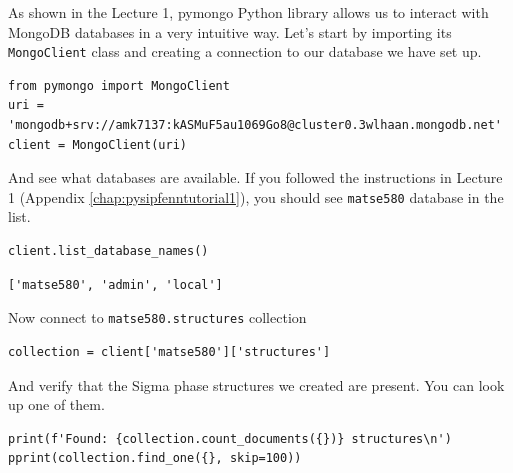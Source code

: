 \label{pysipfenntutorial2:verify-the-connection-to-the-database}

As shown in the Lecture 1, pymongo Python library allows us to interact
with MongoDB databases in a very intuitive way. Let's start by importing
its \texttt{MongoClient} class and creating a
connection to our database we have set up.

\begin{verbatim}
from pymongo import MongoClient
uri = 'mongodb+srv://amk7137:kASMuF5au1069Go8@cluster0.3wlhaan.mongodb.net'
client = MongoClient(uri)
\end{verbatim}

And see what databases are available. If you followed the instructions
in Lecture 1 (Appendix \ref{chap:pysipfenntutorial1}), you should see \texttt{matse580} database
in the list.

\begin{verbatim}
client.list_database_names()
\end{verbatim}

\begin{verbatim}
['matse580', 'admin', 'local']
\end{verbatim}

Now connect to \texttt{matse580.structures} collection

\begin{verbatim}
collection = client['matse580']['structures']
\end{verbatim}

And verify that the Sigma phase structures we created are present. You can look up one of them.

\begin{verbatim}
print(f'Found: {collection.count_documents({})} structures\n')
pprint(collection.find_one({}, skip=100))
\end{verbatim}

